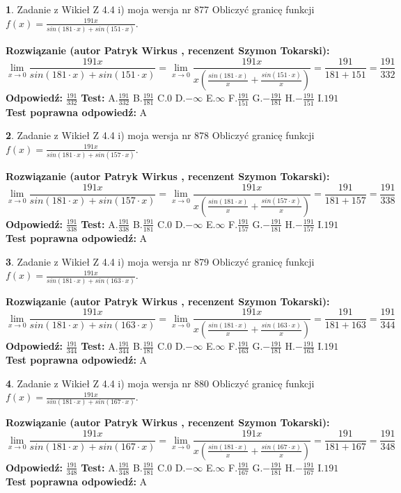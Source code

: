 \documentclass[12pt, a4paper]{article}
\theoremstyle{definition} %
\newtheorem{zad}{}
\newcommand{\zadStart}[1]{\begin{zad}#1\newline}
\newcommand{\zadStop}{\end{zad}}
\newcommand{\rozwStart}[2]{\noindent \textbf{Rozwiązanie (autor #1 , recenzent #2): }\newline}
\newcommand{\rozwStop}{\newline}
\newcommand{\odpStart}{\noindent \textbf{Odpowiedź:}\newline}
\newcommand{\odpStop}{\newline}
\newcommand{\testStart}{\noindent \textbf{Test:}\newline}
\newcommand{\testStop}{\newline}
\newcommand{\kluczStart}{\noindent \textbf{Test poprawna odpowiedź:}\newline}
\newcommand{\kluczStop}{\newline}
\begin{document}
\zadStart{Zadanie z Wikieł Z 4.4 i) moja wersja nr 877}
Obliczyć granicę funkcji $f(x)=\frac{191x}{sin(181\cdot x) +sin(151\cdot x)}$.
\zadStop
\rozwStart{Patryk Wirkus}{Szymon Tokarski}
$$\lim\limits_{x\to 0}\frac{191x}{sin(181\cdot x) +sin(151\cdot x)}=\lim\limits_{x\to 0}\frac{191x}{x(\frac{sin(181\cdot x)}{x}+\frac{sin(151\cdot x)}{x})}=\frac{191}{181+151} = \frac{191}{332}$$
\rozwStop
\odpStart
$\frac{191}{332}$
\odpStop
\testStart
A.$\frac{191}{332}$
B.$\frac{191}{181}$
C.$0$
D.$-\infty$
E.$\infty$
F.$\frac{191}{151}$
G.$-\frac{191}{181}$
H.$-\frac{191}{151}$
I.$191$
\testStop
\kluczStart
A
\kluczStop



\zadStart{Zadanie z Wikieł Z 4.4 i) moja wersja nr 878}
Obliczyć granicę funkcji $f(x)=\frac{191x}{sin(181\cdot x) +sin(157\cdot x)}$.
\zadStop
\rozwStart{Patryk Wirkus}{Szymon Tokarski}
$$\lim\limits_{x\to 0}\frac{191x}{sin(181\cdot x) +sin(157\cdot x)}=\lim\limits_{x\to 0}\frac{191x}{x(\frac{sin(181\cdot x)}{x}+\frac{sin(157\cdot x)}{x})}=\frac{191}{181+157} = \frac{191}{338}$$
\rozwStop
\odpStart
$\frac{191}{338}$
\odpStop
\testStart
A.$\frac{191}{338}$
B.$\frac{191}{181}$
C.$0$
D.$-\infty$
E.$\infty$
F.$\frac{191}{157}$
G.$-\frac{191}{181}$
H.$-\frac{191}{157}$
I.$191$
\testStop
\kluczStart
A
\kluczStop



\zadStart{Zadanie z Wikieł Z 4.4 i) moja wersja nr 879}
Obliczyć granicę funkcji $f(x)=\frac{191x}{sin(181\cdot x) +sin(163\cdot x)}$.
\zadStop
\rozwStart{Patryk Wirkus}{Szymon Tokarski}
$$\lim\limits_{x\to 0}\frac{191x}{sin(181\cdot x) +sin(163\cdot x)}=\lim\limits_{x\to 0}\frac{191x}{x(\frac{sin(181\cdot x)}{x}+\frac{sin(163\cdot x)}{x})}=\frac{191}{181+163} = \frac{191}{344}$$
\rozwStop
\odpStart
$\frac{191}{344}$
\odpStop
\testStart
A.$\frac{191}{344}$
B.$\frac{191}{181}$
C.$0$
D.$-\infty$
E.$\infty$
F.$\frac{191}{163}$
G.$-\frac{191}{181}$
H.$-\frac{191}{163}$
I.$191$
\testStop
\kluczStart
A
\kluczStop



\zadStart{Zadanie z Wikieł Z 4.4 i) moja wersja nr 880}
Obliczyć granicę funkcji $f(x)=\frac{191x}{sin(181\cdot x) +sin(167\cdot x)}$.
\zadStop
\rozwStart{Patryk Wirkus}{Szymon Tokarski}
$$\lim\limits_{x\to 0}\frac{191x}{sin(181\cdot x) +sin(167\cdot x)}=\lim\limits_{x\to 0}\frac{191x}{x(\frac{sin(181\cdot x)}{x}+\frac{sin(167\cdot x)}{x})}=\frac{191}{181+167} = \frac{191}{348}$$
\rozwStop
\odpStart
$\frac{191}{348}$
\odpStop
\testStart
A.$\frac{191}{348}$
B.$\frac{191}{181}$
C.$0$
D.$-\infty$
E.$\infty$
F.$\frac{191}{167}$
G.$-\frac{191}{181}$
H.$-\frac{191}{167}$
I.$191$
\testStop
\kluczStart
A
\kluczStop
\end{document}
